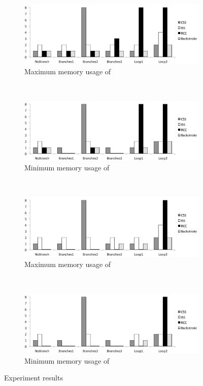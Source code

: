 \begin{figure}%
\centering
%
\begin{subfigure}{\textwidth}
\centering
\includegraphics[width=\FigSize]{figures1/chart1.pdf}
\caption{Maximum memory usage of \Asn}
\end{subfigure}
\\
\begin{subfigure}{\textwidth}
\centering
\includegraphics[width=\FigSize]{figures1/chart2.pdf}
\caption{Minimum memory usage of \Asn}
\end{subfigure}
\\
\begin{subfigure}{\textwidth}
\centering
\includegraphics[width=\FigSize]{figures1/chart3.pdf}
\caption{Maximum memory usage of \Inc}
\end{subfigure}
\\
\begin{subfigure}{\textwidth}
\centering
\includegraphics[width=\FigSize]{figures1/chart4.pdf}
\caption{Minimum memory usage of \Inc}
\end{subfigure}

\caption{Experiment results}
\label{fig:charts}
\end{figure}

